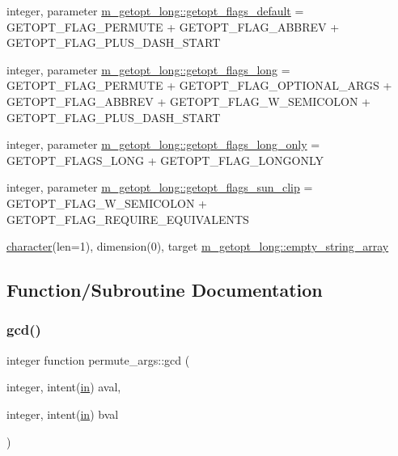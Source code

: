 \begin{DoxyCompactItemize}
integer, parameter \hyperlink{namespacem__getopt__long_a2756f79006f828de56abaf6ee45d2d69}{m\+\_\+getopt\+\_\+long\+::getopt\+\_\+flags\+\_\+default} = G\+E\+T\+O\+P\+T\+\_\+\+F\+L\+A\+G\+\_\+\+P\+E\+R\+M\+U\+TE + G\+E\+T\+O\+P\+T\+\_\+\+F\+L\+A\+G\+\_\+\+A\+B\+B\+R\+EV + G\+E\+T\+O\+P\+T\+\_\+\+F\+L\+A\+G\+\_\+\+P\+L\+U\+S\+\_\+\+D\+A\+S\+H\+\_\+\+S\+T\+A\+RT
\item 
integer, parameter \hyperlink{namespacem__getopt__long_a9c32005623bfe7b86c5b743d4a436247}{m\+\_\+getopt\+\_\+long\+::getopt\+\_\+flags\+\_\+long} = G\+E\+T\+O\+P\+T\+\_\+\+F\+L\+A\+G\+\_\+\+P\+E\+R\+M\+U\+TE + G\+E\+T\+O\+P\+T\+\_\+\+F\+L\+A\+G\+\_\+\+O\+P\+T\+I\+O\+N\+A\+L\+\_\+\+A\+R\+GS + G\+E\+T\+O\+P\+T\+\_\+\+F\+L\+A\+G\+\_\+\+A\+B\+B\+R\+EV + G\+E\+T\+O\+P\+T\+\_\+\+F\+L\+A\+G\+\_\+\+W\+\_\+\+S\+E\+M\+I\+C\+O\+L\+ON + G\+E\+T\+O\+P\+T\+\_\+\+F\+L\+A\+G\+\_\+\+P\+L\+U\+S\+\_\+\+D\+A\+S\+H\+\_\+\+S\+T\+A\+RT
\item 
integer, parameter \hyperlink{namespacem__getopt__long_a86d2892a8786516f1b523c6bc1f373fa}{m\+\_\+getopt\+\_\+long\+::getopt\+\_\+flags\+\_\+long\+\_\+only} = G\+E\+T\+O\+P\+T\+\_\+\+F\+L\+A\+G\+S\+\_\+\+L\+O\+NG + G\+E\+T\+O\+P\+T\+\_\+\+F\+L\+A\+G\+\_\+\+L\+O\+N\+G\+O\+N\+LY
\item 
integer, parameter \hyperlink{namespacem__getopt__long_a752a8bccdeb9074237cfaa0c9435c059}{m\+\_\+getopt\+\_\+long\+::getopt\+\_\+flags\+\_\+sun\+\_\+clip} = G\+E\+T\+O\+P\+T\+\_\+\+F\+L\+A\+G\+\_\+\+W\+\_\+\+S\+E\+M\+I\+C\+O\+L\+ON + G\+E\+T\+O\+P\+T\+\_\+\+F\+L\+A\+G\+\_\+\+R\+E\+Q\+U\+I\+R\+E\+\_\+\+E\+Q\+U\+I\+V\+A\+L\+E\+N\+TS
\item 
\hyperlink{option__stopwatch_83_8txt_abd4b21fbbd175834027b5224bfe97e66}{character}(len=1), dimension(0), target \hyperlink{namespacem__getopt__long_a6f74fcf9d3fc08c69e4df052af120051}{m\+\_\+getopt\+\_\+long\+::empty\+\_\+string\+\_\+array}
\end{DoxyCompactItemize}


\subsection{Function/\+Subroutine Documentation}
\mbox{\label{M__getopt__long_8f90_a45f7c3be12facd750a4b03528039d66c}} 
\subsubsection{\texorpdfstring{gcd()}{gcd()}}
{\footnotesize\ttfamily integer function permute\+\_\+args\+::gcd (\begin{DoxyParamCaption}\item[{integer, intent(\hyperlink{M__journal_83_8txt_afce72651d1eed785a2132bee863b2f38}{in})}]{aval,  }\item[{integer, intent(\hyperlink{M__journal_83_8txt_afce72651d1eed785a2132bee863b2f38}{in})}]{bval }\end{DoxyParamCaption})}

